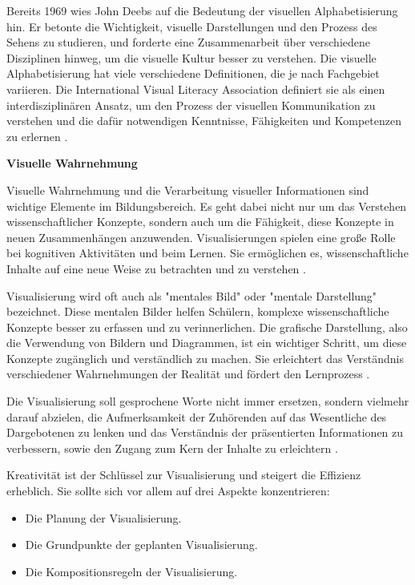 Bereits 1969 wies John Deebs auf die Bedeutung der visuellen Alphabetisierung hin. Er betonte die Wichtigkeit, visuelle Darstellungen und den Prozess des Sehens zu studieren, und forderte eine Zusammenarbeit über verschiedene Disziplinen hinweg, um die visuelle Kultur besser zu verstehen. Die visuelle Alphabetisierung hat viele verschiedene Definitionen, die je nach Fachgebiet variieren. Die International Visual Literacy Association definiert sie als einen interdisziplinären Ansatz, um den Prozess der visuellen Kommunikation zu verstehen und die dafür notwendigen Kenntnisse, Fähigkeiten und Kompetenzen zu erlernen \cite{Wiebe2001}.

\textbf{Visuelle Wahrnehmung}

Visuelle Wahrnehmung und die Verarbeitung visueller Informationen sind wichtige Elemente im Bildungsbereich. Es geht dabei nicht nur um das Verstehen wissenschaftlicher Konzepte, sondern auch um die Fähigkeit, diese Konzepte in neuen Zusammenhängen anzuwenden. Visualisierungen spielen eine große Rolle bei kognitiven Aktivitäten und beim Lernen. Sie ermöglichen es, wissenschaftliche Inhalte auf eine neue Weise zu betrachten und zu verstehen \cite{Wiebe2001}.

Visualisierung wird oft auch als "mentales Bild" oder "mentale Darstellung" bezeichnet. Diese mentalen Bilder helfen Schülern, komplexe wissenschaftliche Konzepte besser zu erfassen und zu verinnerlichen. Die grafische Darstellung, also die Verwendung von Bildern und Diagrammen, ist ein wichtiger Schritt, um diese Konzepte zugänglich und verständlich zu machen. Sie erleichtert das Verständnis verschiedener Wahrnehmungen der Realität und fördert den Lernprozess \cite{Duval1999}.

Die Visualisierung soll gesprochene Worte nicht immer ersetzen, sondern vielmehr darauf abzielen, die Aufmerksamkeit der Zuhörenden auf das Wesentliche des Dargebotenen zu lenken und das Verständnis der präsentierten Informationen zu verbessern, sowie den Zugang zum Kern der Inhalte zu erleichtern \cite{Gilbert2005}.

Kreativität ist der Schlüssel zur Visualisierung und steigert die Effizienz erheblich. Sie sollte sich vor allem auf drei Aspekte konzentrieren:
\begin{itemize}
	\item Die Planung der Visualisierung.
	\item Die Grundpunkte der geplanten Visualisierung.
	\item Die Kompositionsregeln der Visualisierung.
\end{itemize}

